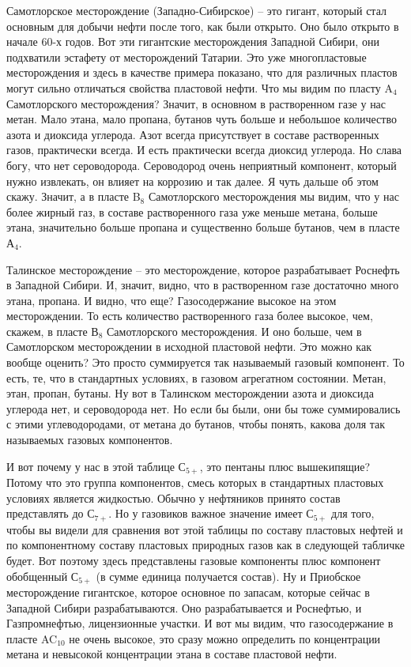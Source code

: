 \documentclass[main.tex]{subfiles}
\begin{document}
Самотлорское месторождение (Западно-Сибирское) -- это гигант, который стал основным для добычи нефти после того, как были открыто.
Оно было открыто в начале 60-х годов.
Вот эти гигантские месторождения Западной Сибири, они подхватили эстафету от месторождений Татарии.
Это уже многопластовые месторождения и здесь в качестве примера показано, что для различных пластов могут сильно отличаться свойства пластовой нефти.
Что мы видим по пласту A$_4$ Самотлорского месторождения?
Значит, в основном в растворенном газе у нас метан.
Мало этана, мало пропана, бутанов чуть больше и небольшое количество азота и диоксида углерода.
Азот всегда присутствует в составе растворенных газов, практически всегда.
И есть практически всегда диоксид углерода.
Но слава богу, что нет сероводорода.
Сероводород очень неприятный компонент, который нужно извлекать, он влияет на коррозию и так далее.
Я чуть дальше об этом скажу.
Значит, а в пласте B$_8$ Самотлорского месторождения мы видим, что у нас более жирный газ, в составе растворенного газа уже меньше метана, больше этана, значительно больше пропана
и существенно больше бутанов, чем в пласте А$_4$.

Талинское месторождение -- это месторождение, которое разрабатывает Роснефть в Западной Сибири.
И, значит, видно, что в растворенном газе достаточно много этана, пропана.
И видно, что еще?
Газосодержание высокое на этом месторождении.
То есть количество растворенного газа более высокое, чем, скажем, в пласте В$_8$ Самотлорского месторождения.
И оно больше, чем в Самотлорском месторождении в исходной пластовой нефти.
Это можно как вообще оценить?
Это просто суммируется так называемый газовый компонент.
То есть, те, что в стандартных условиях, в газовом агрегатном состоянии.
Метан, этан, пропан, бутаны.
Ну вот в Талинском месторождении азота и диоксида углерода нет, и сероводорода нет.
Но если бы были, они бы тоже суммировались с этими углеводородами, от метана до бутанов, чтобы понять, какова доля так называемых газовых компонентов.

И вот почему у нас в этой таблице $С_{5+}$, это пентаны плюс вышекипящие?
Потому что это группа компонентов, смесь которых в стандартных пластовых условиях является жидкостью.
Обычно у нефтяников принято состав представлять до $С_{7+}$.
Но у газовиков важное значение имеет $С_{5+}$ для того, чтобы вы видели для сравнения вот этой таблицы по составу пластовых нефтей и по компонентному составу пластовых природных газов как в следующей табличке будет.
Вот поэтому здесь представлены газовые компоненты плюс компонент обобщенный $С_{5+}$ (в сумме единица получается состав).
Ну и Приобское месторождение гигантское, которое основное по запасам, которые сейчас в Западной Сибири разрабатываются.
Оно разрабатывается и Роснефтью, и Газпромнефтью, лицензионные участки.
И вот мы видим, что газосодержание в пласте AC$_{10}$ не очень высокое, это сразу можно определить по концентрации метана и невысокой концентрации этана в составе пластовой нефти.
\end{document}
